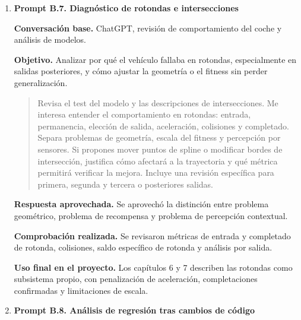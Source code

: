 {\begin{enumerate}[leftmargin=*,itemsep=0.2\baselineskip,topsep=2pt,parsep=0pt,partopsep=0pt]
  \textbf{Respuesta aprovechada.} Se aprovechó la idea de no tratar cada copia fechada como un modelo independiente si sus pesos no aportaban una política distinta.

  \textbf{Comprobación realizada.} Se compararon pesos, informes de test y métricas por sesión, usando \texttt{SuperCarModel} como referencia del modelo evaluado en modo test y reservando \texttt{SessionCarModel} para el contexto de entrenamiento o sesión.

  \textbf{Uso final en el proyecto.} El capítulo 6 explica la persistencia de modelos y el capítulo 7 evita sustituir la referencia por sesiones posteriores no reproducibles.

  \item \textbf{Prompt B.7. Diagnóstico de rotondas e intersecciones}

  \textbf{Conversación base.} ChatGPT, revisión de comportamiento del coche y análisis de modelos.

  \textbf{Objetivo.} Analizar por qué el vehículo fallaba en rotondas, especialmente en salidas posteriores, y cómo ajustar la geometría o el fitness sin perder generalización.

  \promptDepurado
  \begin{quote}
  \small
  Revisa el test del modelo y las descripciones de intersecciones. Me interesa entender el comportamiento en rotondas: entrada, permanencia, elección de salida, aceleración, colisiones y completado. Separa problemas de geometría, escala del fitness y percepción por sensores. Si propones mover puntos de spline o modificar bordes de intersección, justifica cómo afectará a la trayectoria y qué métrica permitirá verificar la mejora. Incluye una revisión específica para primera, segunda y tercera o posteriores salidas.
  \end{quote}

  \textbf{Respuesta aprovechada.} Se aprovechó la distinción entre problema geométrico, problema de recompensa y problema de percepción contextual.

  \textbf{Comprobación realizada.} Se revisaron métricas de entrada y completado de rotonda, colisiones, saldo específico de rotonda y análisis por salida.

  \textbf{Uso final en el proyecto.} Los capítulos 6 y 7 describen las rotondas como subsistema propio, con penalización de aceleración, completaciones confirmadas y limitaciones de escala.

  \item \textbf{Prompt B.8. Análisis de regresión tras cambios de código}


\end{enumerate}}
